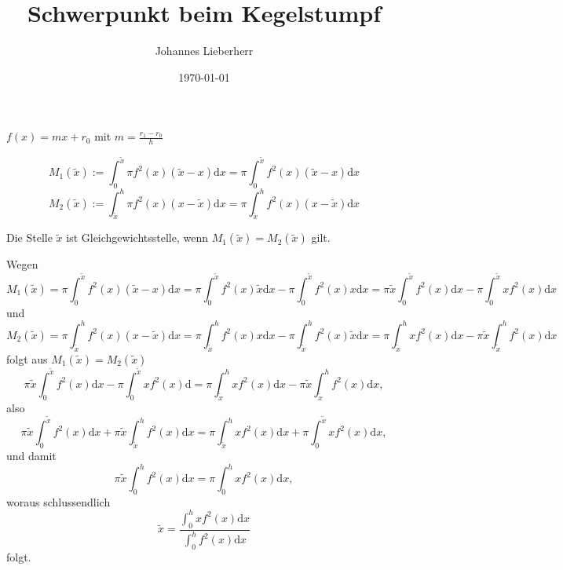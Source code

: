 \documentclass{article}
\title{Schwerpunkt beim Kegelstumpf}
\author{Johannes Lieberherr}
\date{\today}
\begin{document}
\maketitle
{}
 
$f(x)=mx+r_0$ mit $m=\frac{r_1-r_0}{h}$

$$M_1(\tilde{x}):=\int_{0}^{\tilde{x}}{\pi f^2(x)(\tilde{x}-x)}\mathrm{d}x = \pi\int_{0}^{\tilde{x}}{ f^2(x)(\tilde{x}-x)}\mathrm{d}x$$
$$M_2(\tilde{x}):=\int_{\tilde{x}}^{h}{\pi f^2(x)(x-\tilde{x})}\mathrm{d}x = \pi\int_{\tilde{x}}^{h}{ f^2(x)(x-\tilde{x})}\mathrm{d}x$$


Die Stelle $\tilde{x}$ ist Gleichgewichtsstelle, wenn  $M_1(\tilde{x}) = M_2(\tilde{x})$ gilt.

Wegen 
$$M_1(\tilde{x})= \pi\int_{0}^{\tilde{x}}{ f^2(x)(\tilde{x}-x)}\mathrm{d}x =\pi\int_{0}^{\tilde{x}}{ f^2(x)\tilde{x}}\mathrm{d}x - \pi\int_{0}^{\tilde{x}}{ f^2(x)x}\mathrm{d}x = \pi\tilde{x}\int_{0}^{\tilde{x}}{ f^2(x)}\mathrm{d}x - \pi\int_{0}^{\tilde{x}}{xf^2(x)}\mathrm{d}x$$ und
$$M_2(\tilde{x})= \pi\int_{\tilde{x}}^{h}{ f^2(x)(x-\tilde{x})}\mathrm{d}x = \pi\int_{\tilde{x}}^{h}{ f^2(x)x}\mathrm{d}x - \pi\int_{\tilde{x}}^{h}{ f^2(x)\tilde{x}}\mathrm{d}x = \pi\int_{\tilde{x}}^{h}{xf^2(x)}\mathrm{d}x - \pi\tilde{x}\int_{\tilde{x}}^{h}{f^2(x)}\mathrm{d}x$$
folgt aus $M_1(\tilde{x}) = M_2(\tilde{x})$
$$\pi\tilde{x}\int_{0}^{\tilde{x}}{ f^2(x)}\mathrm{d}x - \pi\int_{0}^{\tilde{x}}{xf^2(x)}\mathrm{d} = \pi\int_{\tilde{x}}^{h}{xf^2(x)}\mathrm{d}x - \pi\tilde{x}\int_{\tilde{x}}^{h}{f^2(x)}\mathrm{d}x,$$
also 
$$\pi\tilde{x}\int_{0}^{\tilde{x}}{ f^2(x)}\mathrm{d}x + \pi\tilde{x}\int_{\tilde{x}}^{h}{f^2(x)}\mathrm{d}x = \pi\int_{\tilde{x}}^{h}{xf^2(x)}\mathrm{d}x + \pi\int_{0}^{\tilde{x}}{xf^2(x)}\mathrm{d}x,$$
und damit
$$\pi\tilde{x}\int_{0}^{h}{ f^2(x)}\mathrm{d}x = \pi\int_{0}^{h}{xf^2(x)}\mathrm{d}x,$$
woraus schlussendlich
$$\tilde{x} = \frac{\int_{0}^{h}{xf^2(x)}\mathrm{d}x}{\int_{0}^{h}{ f^2(x)}\mathrm{d}x}$$ 
folgt.
\end{document}
